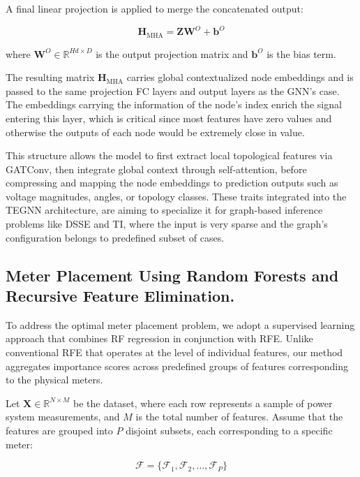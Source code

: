 \documentclass[journal]{IEEEtran}  %
\begin{document}
A final linear projection is applied to merge the concatenated output:

\begin{equation}
\label{eq:MHA_output}
\mathbf{H}_{\text{MHA}} = \mathbf{Z} \mathbf{W}^{O} + \mathbf{b}^{O}
\end{equation}

where \( \mathbf{W}^{O} \in \mathbb{R}^{Hd \times D} \) is the output projection matrix and \( \mathbf{b}^{O} \) is the bias term.

The resulting matrix \( \mathbf{H}_{\text{MHA}} \) carries global contextualized node embeddings and is passed to the same projection FC layers and output layers as the GNN's case. The embeddings carrying the information of the node's index enrich the signal entering this layer, which is critical since most features have zero values and otherwise the outputs of each node would be extremely close in value.

This structure allows the model to first extract local topological features via GATConv, then integrate global context through self-attention, before compressing and mapping the node embeddings to prediction outputs such as voltage magnitudes, angles, or topology classes. These traits integrated into the TEGNN architecture, are aiming to specialize it for graph-based inference problems like DSSE and TI, where the input is very sparse and the graph's configuration belongs to predefined subset of cases.


\subsection{Meter Placement Using Random Forests and Recursive Feature Elimination.}

To address the optimal meter placement problem, we adopt a supervised learning approach that combines RF regression in conjunction with RFE. Unlike conventional RFE that operates at the level of individual features, our method aggregates importance scores across predefined groups of features corresponding to the physical meters.

Let $\mathbf{X} \in \mathbb{R}^{N \times M}$ be the dataset, where each row represents a sample of power system measurements, and $M$ is the total number of features. Assume that the features are grouped into $P$ disjoint subsets, each corresponding to a specific meter:

\begin{equation}
\label{eq:Feature Groups}
\mathcal{F} = \{ \mathcal{F}_1, \mathcal{F}_2, \ldots, \mathcal{F}_P \}
\end{equation}
\end{document}
